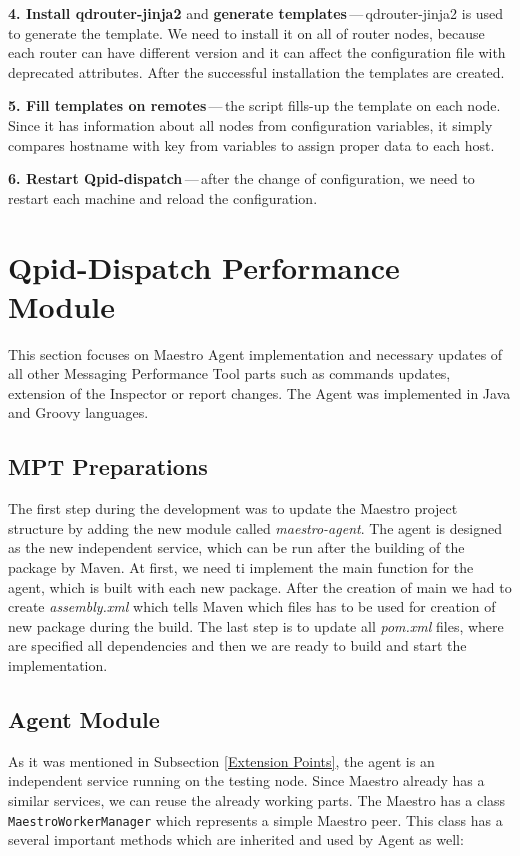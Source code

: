 \begin{description}
	\item \textbf{4. Install qdrouter-jinja2} and \textbf{generate templates}\,---\,qdrouter-jinja2 is used to generate the template. We need to install it on all of router nodes, because each router can have different version and it can affect the configuration file with deprecated attributes. After the successful installation the templates are created.
	\item \textbf{5. Fill templates on remotes}\,---\,the script fills-up the template on each node. Since it has information about all nodes from configuration variables, it simply compares hostname with key from variables to assign proper data to each host.
	\item \textbf{6. Restart Qpid-dispatch}\,---\,after the change of configuration, we need to restart each machine and reload the configuration.
\end{description}

\section{Qpid-Dispatch Performance Module}
This section focuses on Maestro Agent implementation and necessary updates of all other Messaging Performance Tool parts such as commands updates, extension of the Inspector or report changes. The Agent was implemented in Java and Groovy languages.

\subsection{MPT Preparations}
\label{MPT Preparations}
The first step during the development was to update the Maestro project structure by adding the new module called \emph{maestro-agent}. The agent is designed as the new independent service, which can be run after the building of the package by Maven. At first, we need ti implement the main function for the agent, which is built with each new package. After the creation of main we had to create \emph{assembly.xml} which tells Maven which files has to be used for creation of new package during the build. The last step is to update all \emph{pom.xml} files, where are specified all dependencies and then we are ready to build and start the implementation.

\subsection{Agent Module}
As it was mentioned in Subsection \ref{Extension Points}, the agent is an independent service running on the testing node. Since Maestro already has a similar services, we can reuse the already working parts. The Maestro has a class \texttt{MaestroWorkerManager} which represents a simple Maestro peer. This class has a several important methods which are inherited and used by Agent as well:


